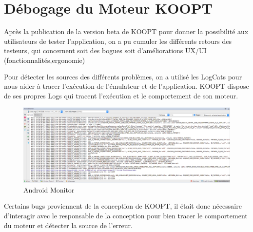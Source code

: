 \chapter{Débogage du Moteur KOOPT }
\label{chap:debogage du Moteur KOOPT }


Après la publication de la version beta de KOOPT pour donner la possibilité aux utilisateurs de tester l’application, on a pu cumuler les différents retours des testeurs,
qui concernent soit des bogues soit d'améliorations UX/UI (fonctionnalités,ergonomie)
  
Pour détecter les sources des différents problèmes, on a utilisé les LogCats pour nous aider à tracer l’exécution de l’émulateur et de l’application.
KOOPT dispose de ses propres Logs qui tracent l’exécution et le comportement de son moteur.
 
  \begin{figure}[H]
\begin{center}
\includegraphics[width=1\linewidth]{images/androidmonitor}
\end{center}
\caption{Android Monitor}
\label{fig:19}
\end{figure}
 
Certains bugs proviennent de la conception de KOOPT, il était donc nécessaire d'interagir avec le responsable de la conception pour bien tracer le comportement du moteur et détecter la source de l’erreur.
 
